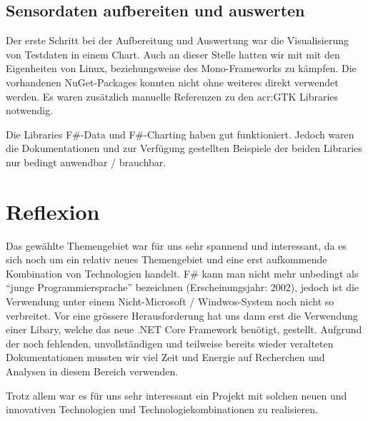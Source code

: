 \subsection{Sensordaten aufbereiten und auswerten}
Der erste Schritt bei der Aufbereitung und Auswertung war die Visualisierung von Testdaten in einem Chart. Auch an dieser Stelle hatten wir mit mit den Eigenheiten von Linux, beziehungsweise des Mono-Frameworks zu kämpfen. Die vorhandenen NuGet-Packages konnten nicht ohne weiteres direkt verwendet werden. Es waren zusätzlich manuelle Referenzen zu den \gls{acr:GTK} Libraries notwendig. 

Die Libraries F\#-Data und F\#-Charting haben gut funktioniert. Jedoch waren die Dokumentationen und zur Verfügung gestellten Beispiele der beiden Libraries nur bedingt anwendbar / brauchbar.


\section{Reflexion}
Das gewählte Themengebiet war für uns sehr spannend und interessant, da es sich noch um ein relativ neues Themengebiet und eine erst aufkommende Kombination von Technologien handelt. F\# kann man nicht mehr unbedingt als "`junge Programmiersprache"' bezeichnen (Erscheinungsjahr: 2002), jedoch ist die Verwendung unter einem Nicht-Microsoft / Windwos-System noch nicht so verbreitet. Vor eine grössere Herausforderung hat uns dann erst die Verwendung einer Libary, welche das neue .NET Core Framework benötigt, gestellt. Aufgrund der noch fehlenden, unvollständigen und teilweise bereits wieder veralteten Dokumentationen mussten wir viel Zeit und Energie auf Recherchen und Analysen in diesem Bereich verwenden.


Trotz allem war es für uns sehr interessant ein Projekt mit solchen neuen und innovativen Technologien und Technologiekombinationen zu realisieren. 